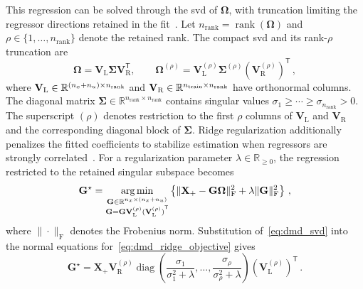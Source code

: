 This regression can be solved through the \ac{svd} of $\boldsymbol{\Omega}$, with truncation limiting the regressor directions retained in the fit~\cite{Proctor2016}.
Let $n_{\mathrm{rank}}=\operatorname{rank}(\boldsymbol{\Omega})$ and $\rho\in\{1,\ldots,n_{\mathrm{rank}}\}$ denote the retained rank.
The compact \ac{svd} and its rank-$\rho$ truncation are
\begin{equation}
    \boldsymbol{\Omega}=\mathbf{V}_{\mathrm{L}}\boldsymbol{\Sigma}\mathbf{V}_{\mathrm{R}}^{\mathsf{T}},
    \qquad
    \boldsymbol{\Omega}^{(\rho)}
    =\mathbf{V}_{\mathrm{L}}^{(\rho)}\boldsymbol{\Sigma}^{(\rho)}{(\mathbf{V}_{\mathrm{R}}^{(\rho)})}^{\mathsf{T}}\,,
    \label{eq:dmd_svd}
\end{equation}
where $\mathbf{V}_{\mathrm{L}}\in\mathbb{R}^{(n_{x}+n_{u})\times n_{\mathrm{rank}}}$ and $\mathbf{V}_{\mathrm{R}}\in\mathbb{R}^{n_{\mathrm{train}}{}\times n_{\mathrm{rank}}}$ have orthonormal columns.
The diagonal matrix $\boldsymbol{\Sigma}\in\mathbb{R}^{n_{\mathrm{rank}}\times n_{\mathrm{rank}}}$ contains singular values $\sigma_1\geq\cdots\geq \sigma_{n_{\mathrm{rank}}}>0$.
The superscript $(\rho)$ denotes restriction to the first $\rho$ columns of $\mathbf{V}_{\mathrm{L}}$ and $\mathbf{V}_{\mathrm{R}}$ and the corresponding diagonal block of $\boldsymbol{\Sigma}$.
Ridge regularization additionally penalizes the fitted coefficients to stabilize estimation when regressors are strongly correlated~\cite{Boyd2004}.
For a regularization parameter $\lambda\in\mathbb{R}_{\geq0}$, the regression restricted to the retained singular subspace becomes
\begin{equation}
    \mathbf{G}^{\star}
    =\underset{\substack{\mathbf{G}\in\mathbb{R}^{n_{x}\times(n_{x}+n_{u})}\\
        \mathbf{G}=\mathbf{G}\mathbf{V}_{\mathrm{L}}^{(\rho)}{(\mathbf{V}_{\mathrm{L}}^{(\rho)})}^{\mathsf{T}}}}
        {\arg\min}
    \left\{
        \|\mathbf{X}_+-\mathbf{G}\boldsymbol{\Omega}\|_\mathrm{F}^2
        +\lambda\|\mathbf{G}\|_\mathrm{F}^2
    \right\}\,,
    \label{eq:dmd_ridge_objective}
\end{equation}
where $\|\cdot\|_\mathrm{F}$ denotes the Frobenius norm.
Substitution of~\eqref{eq:dmd_svd} into the normal equations for~\eqref{eq:dmd_ridge_objective} gives
\begin{equation}
    \mathbf{G}^{\star}
    =\mathbf{X}_+\mathbf{V}_{\mathrm{R}}^{(\rho)}
    \operatorname{diag}\!\left(
        \frac{\sigma_1}{\sigma_1^2+\lambda},\ldots,
        \frac{\sigma_\rho}{\sigma_\rho^2+\lambda}
    \right)
    {(\mathbf{V}_{\mathrm{L}}^{(\rho)})}^{\mathsf{T}}\,.
    \label{eq:dmd_ridge_solution}
\end{equation}
